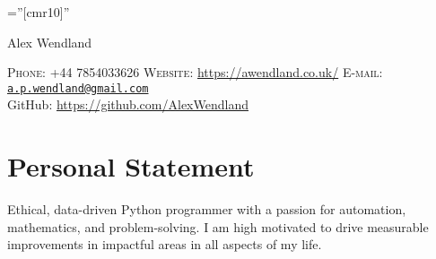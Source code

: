 \documentclass[a4paper,10pt]{article}
\begin{document}
\pagestyle{empty} %

\font\fb=''[cmr10]'' %

\par{\centering
		{\Huge Alex Wendland
	}\bigskip\par}
\vspace{-0.3 cm}
\begin{center}
	\textsc{Phone:} +44 7854033626 \hspace{1cm} \textsc{Website:} \href{https://awendland.co.uk/}{https://awendland.co.uk/} \hspace{1cm} \textsc{E-mail:} \href{mailto:a.p.wendland@gmail.com}{\texttt{a.p.wendland@gmail.com}}\\
	GitHub: \href{https://github.com/AlexWendland}{https://github.com/AlexWendland}
\end{center}

\section{Personal Statement}

Ethical, data-driven Python programmer with a passion for automation, mathematics, and problem-solving. I am high motivated to drive measurable improvements in impactful areas in all aspects of my life.
\end{document}
